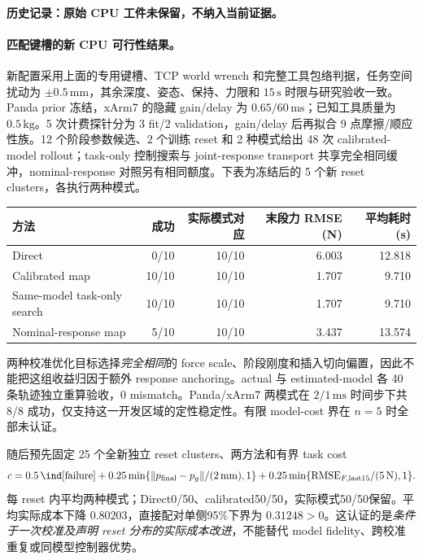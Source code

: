 \paragraph{历史记录：原始 CPU 工件未保留，不纳入当前证据。}
\paragraph{匹配键槽的新 CPU 可行性结果。}
新配置采用上面的专用键槽、TCP world wrench 和完整工具包络判据，任务空间扰动为 $\pm0.5\,\mathrm{mm}$，其余深度、姿态、保持、力限和 $15\,\mathrm s$ 时限与研究验收一致。Panda prior 冻结，xArm7 的隐藏 gain/delay 为 $0.65/60\,\mathrm{ms}$；已知工具质量为 $0.5\,\mathrm{kg}$。5 次计费探针分为 3 fit/2 validation，gain/delay 后再拟合 9 点摩擦/顺应性族。12 个阶段参数候选、2 个训练 reset 和 2 种模式给出 48 次 calibrated-model rollout；task-only 控制搜索与 joint-response transport 共享完全相同缓冲，nominal-response 对照另有相同额度。下表为冻结后的 5 个新 reset clusters，各执行两种模式。
\begin{center}
\small
\begin{tabular}{lrrrr}
\toprule
方法 & 成功 & 实际模式对应 & 末段力 RMSE (N) & 平均耗时 (s)\\
\midrule
Direct & 0/10 & 10/10 & 6.003 & 12.818\\
Calibrated map & 10/10 & 10/10 & 1.707 & 9.710\\
Same-model task-only search & 10/10 & 10/10 & 1.707 & 9.710\\
Nominal-response map & 5/10 & 10/10 & 3.437 & 13.574\\
\bottomrule
\end{tabular}
\end{center}
两种校准优化目标选择\emph{完全相同}的 force scale、阶段刚度和插入切向偏置，因此不能把这组收益归因于额外 response anchoring。actual 与 estimated-model 各 40 条轨迹独立重算验收，0 mismatch。Panda/xArm7 两模式在 $2/1\,\mathrm{ms}$ 时间步下共 8/8 成功，仅支持这一开发区域的定性稳定性。有限 model-cost 界在 $n=5$ 时全部未认证。

随后预先固定 25 个全新独立 reset clusters、两方法和有界 task cost
\[
 c=0.5\,\ind[\mathrm{failure}]+0.25\min\{\|p_{\rm final}-p_g\|/(2\,\mathrm{mm}),1\}
   +0.25\min\{\mathrm{RMSE}_{F,\mathrm{last15}}/(5\,\mathrm N),1\}.
\]
每 reset 内平均两种模式；Direct0/50、calibrated50/50，实际模式50/50保留。平均实际成本下降 $0.80203$，直接配对单侧95\%下界为 $0.31248>0$。这认证的是\emph{条件于一次校准及声明 reset 分布的实际成本改进}，不能替代 model fidelity、跨校准重复或同模型控制器优势。

